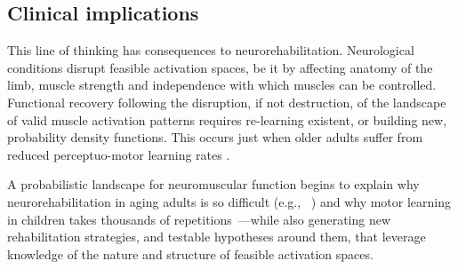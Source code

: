 \documentclass[9pt,twocolumn,twoside,lineno]{pnas-new}
\begin{document}
\subsection*{Clinical implications}
This line of thinking has consequences to neurorehabilitation. Neurological conditions disrupt feasible activation spaces, be it by affecting anatomy of the limb, muscle strength and independence with which muscles can be controlled. Functional recovery following the disruption, if not destruction, of the landscape of valid muscle activation patterns requires re-learning existent, or building new, probability density functions. This occurs just when older adults suffer from reduced perceptuo-motor learning rates \cite{coats201450scliff}.

A probabilistic landscape for neuromuscular function begins to explain why neurorehabilitation in aging adults is so difficult (e.g., ~\cite{hardwick2016motor}) and why motor learning in children takes thousands of repetitions~\cite{adolph2012thousands}---while also generating new rehabilitation strategies, and testable hypotheses around them, that leverage knowledge of the nature and structure of feasible activation spaces.
\end{document}

